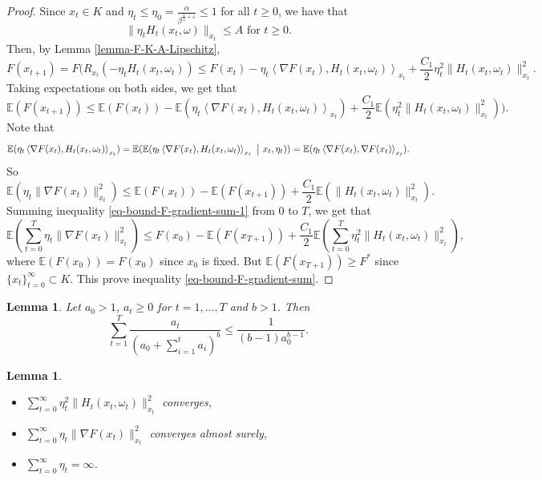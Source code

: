 \documentclass{amsart}
\newcommand{\E}{\mathbb{E}}
\newcommand{\ve}{\varepsilon}
\theoremstyle{plain}
\newtheorem{lemma}[theorem]{Lemma}
\theoremstyle{definition}
\theoremstyle{remark}
\numberwithin{theorem}{section}
\numberwithin{equation}{section}
\begin{document}
\begin{proof}
Since $x_t\in K$ and $\eta_t\leq  \eta_0=\frac{\alpha}{\beta^{\frac{1}{2}+\ve}}\leq 1$ for all $t\geq 0$, we have that 
\begin{equation}\label{eq-eta-H-bound}
\| \eta_t H_t(x_t,\omega)\|_{x_t} \leq A \text{ for } t\geq 0.
\end{equation} 
Then, by Lemma \ref{lemma-F-K-A-Lipschitz},
\begin{equation}\label{eq-lemma-F-K-A-Lipschitz-ada}
F(x_{t+1}) = F(R_{x_t}(-\eta_t H_t(x_t,\omega_t)) \leq F(x_{t}) - \eta_t\left\langle \nabla F(x_t),  H_t(x_t,\omega_t)\right\rangle_{x_t} + \frac{C_1}{2} \eta_t^2\|H_t(x_t,\omega_t) \|_{x_t}^2.
\end{equation}
Taking expectations on both sides, we get that
\[
\E(F(x_{t+1})) \leq \E(F(x_{t})) - \E(\eta_t\left\langle \nabla F(x_t),  H_t(x_t,\omega_t)\right\rangle_{x_t}) + \frac{C_1}{2} \E(\eta_t^2\|H_t(x_t,\omega_t) \|_{x_t}^2)).
\]
Note that
\[
\E(\eta_t\left\langle \nabla F(x_t),  H_t(x_t,\omega_t)\right\rangle_{x_t}) = \E(\E(\eta_t\left\langle \nabla F(x_t),  H_t(x_t,\omega_t)\right\rangle_{x_t}~\big{|}~ x_t,\eta_t)) = \E(\eta_t\left\langle \nabla F(x_t),  \nabla F(x_t)\right\rangle_{x_t}).
\]
So 
\begin{equation}\label{eq-bound-F-gradient-sum-1}
\E(\eta_t \|\nabla F(x_t)\|_{x_t}^2) \leq \E(F(x_t)) - \E(F(x_{t+1})) + \frac{C_1}{2}\E( \|H_t(x_t,\omega_t)\|_{x_t}^2).
\end{equation}
Summing inequality \eqref{eq-bound-F-gradient-sum-1} from $0$ to $T$, we get that
\begin{equation}\label{eq-bound-F-gradient-sum-2}
\E(\sum_{t=0}^T \eta_t \|\nabla F(x_t)\|_{x_t}^2) \leq F(x_0) - \E(F(x_{T+1})) + \frac{C_1}{2}\E(\sum_{t=0}^T \eta_t^2 \|H_t(x_t,\omega_t)\|_{x_t}^2),
\end{equation}
where $\E(F(x_0)) = F(x_0)$ since $x_0$ is fixed. But $\E(F(x_{T+1}))\geq F^{\ast}$ since $\{x_{t}\}_{t=0}^\infty \subset K$. This prove inequality \eqref{eq-bound-F-gradient-sum}.
\end{proof}



\begin{lemma}\cite[Lemma 2]{Li-Orabona}  \label{lemma-Li-Orabona-2}
Let $a_0>1$, $a_t\geq 0$ for $t=1,\dots, T$ and $b>1$. Then 
\[
\sum_{t=1}^T \frac{a_t}{(a_0+\sum_{i=1}^ta_i)^b} \leq \frac{1}{(b-1)a_0^{b-1}}.
\]
\end{lemma}

\begin{lemma}\label{lemma-gradient-square-sum-converge}
\begin{itemize}
	\item $\sum_{t=0}^\infty \eta_t^2\| H_t(x_t, \omega_t)\|_{x_t}^2$ converges,
	\item $\sum_{t=0}^\infty \eta_t\| \nabla F(x_t)\|_{x_t}^2$ converges almost surely,
	\item $\sum_{t=0}^\infty \eta_t = \infty$.
\end{itemize}
\end{lemma}
\end{document}
